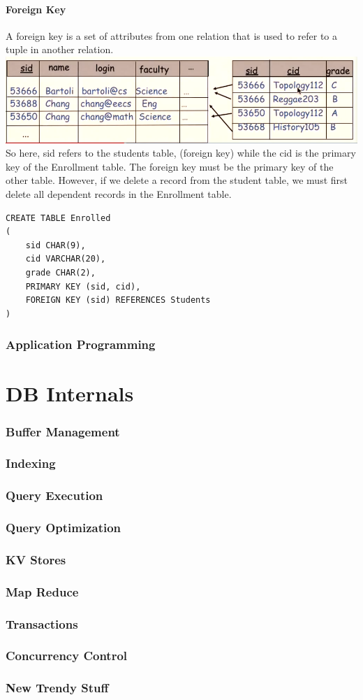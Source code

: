 \documentclass[12pt]{article}
\theoremstyle{definition}
\begin{document}
\subsection{Foreign Key}
A foreign key is a set of attributes from one relation that is used to refer to a tuple in another relation. 
\\ \includegraphics{foreign-key} \\
So here, sid refers to the students table, (foreign key) while the cid is the primary key of the Enrollment table. The foreign key must  be the primary key of the other table. However, if we delete a record from the student table, we must first delete all dependent records in the Enrollment table.
\begin{lstlisting}
CREATE TABLE Enrolled
(
	sid CHAR(9),
	cid VARCHAR(20),
	grade CHAR(2),
	PRIMARY KEY (sid, cid),
	FOREIGN KEY (sid) REFERENCES Students
)
\end{lstlisting}
\section{Application Programming}

\part{DB Internals}
\section{Buffer Management}
\section{Indexing}
\section{Query Execution}
\section{Query Optimization}
\section{KV Stores}
\section{Map Reduce}
\section{Transactions}
\section{Concurrency Control}
\section{New Trendy Stuff}
\end{document}
